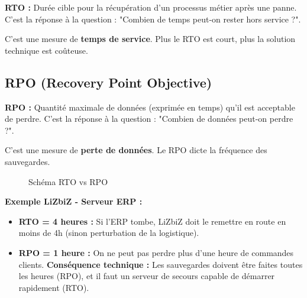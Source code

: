 \begin{boxdef}
\textbf{RTO :} Durée cible pour la récupération d'un processus métier après une panne. C'est la réponse à la question : "Combien de temps peut-on rester hors service ?".
\end{boxdef}

C'est une mesure de \textbf{temps de service}. Plus le RTO est court, plus la solution technique est coûteuse.

\subsection{RPO (Recovery Point Objective)}

\begin{boxdef}
\textbf{RPO :} Quantité maximale de données (exprimée en temps) qu'il est acceptable de perdre. C'est la réponse à la question : "Combien de données peut-on perdre ?".
\end{boxdef}

C'est une mesure de \textbf{perte de données}. Le RPO dicte la fréquence des sauvegardes.

\begin{figure}[htbp]
\centering
{}
\caption{Schéma RTO vs RPO}
\end{figure}

\begin{boxlizbiz}
\textbf{Exemple LiZbiZ - Serveur ERP :}
\begin{itemize}
    \item \textbf{RTO = 4 heures :} Si l'ERP tombe, LiZbiZ doit le remettre en route en moins de 4h (sinon perturbation de la logistique).
    \item \textbf{RPO = 1 heure :} On ne peut pas perdre plus d'une heure de commandes clients.
    \textbf{Conséquence technique :} Les sauvegardes doivent être faites toutes les heures (RPO), et il faut un serveur de secours capable de démarrer rapidement (RTO).
\end{itemize}
\end{boxlizbiz}

